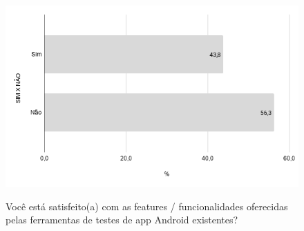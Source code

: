     
        \begin{figure}[!htb]
        \centering
        \includegraphics[width=.80\textwidth]{images/s_featuresexistentes.png}
        \label{figure:s_featuresexistentes}
        \caption{Você está satisfeito(a) com as features  / funcionalidades oferecidas pelas ferramentas de testes de app Android existentes?}
        \end{figure}


    
    
















